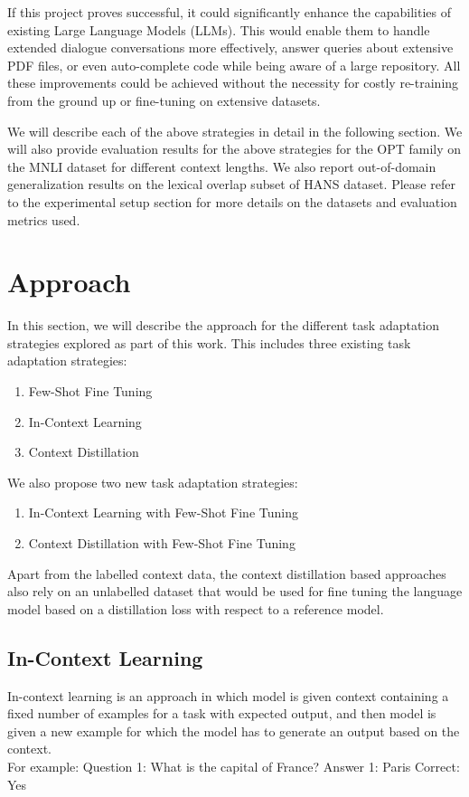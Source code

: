 \documentclass[10pt,twocolumn,letterpaper]{article}
\begin{document}
If this project proves successful, it could significantly enhance the capabilities of existing Large Language Models (LLMs). This would enable them to handle extended dialogue conversations more effectively, answer queries about extensive PDF files, or even auto-complete code while being aware of a large repository. All these improvements could be achieved without the necessity for costly re-training from the ground up or fine-tuning on extensive datasets.


We will describe each of the above strategies in detail in the following section. We will also provide evaluation results for the above strategies for the OPT family on the MNLI dataset for different context lengths. We also report out-of-domain generalization results on the lexical overlap subset of HANS dataset. Please refer to the experimental setup section for more details on the datasets and evaluation metrics used.

\section{Approach}
In this section, we will describe the approach for the different task adaptation strategies explored as part of this work. This includes three existing task adaptation strategies:
\begin{enumerate}
	\item Few-Shot Fine Tuning
	\item In-Context Learning
	\item Context Distillation
\end{enumerate}
We also propose two new task adaptation strategies:
\begin{enumerate}
	\item In-Context Learning with Few-Shot Fine Tuning 
	\item Context Distillation with Few-Shot Fine Tuning
\end{enumerate}
Apart from the labelled context data, the context distillation based approaches also rely on an unlabelled dataset that would be used for fine tuning the language model based on a distillation loss with respect to a reference model. 
\subsection{In-Context Learning}
In-context learning is an approach in which model is given context containing a fixed number of examples for a task with expected output, and then model is given a 
new example for which the model has to generate an output based on the context. \\
For example:
Question 1: What is the capital of France?
Answer 1: Paris
Correct: Yes
    
\end{document}
